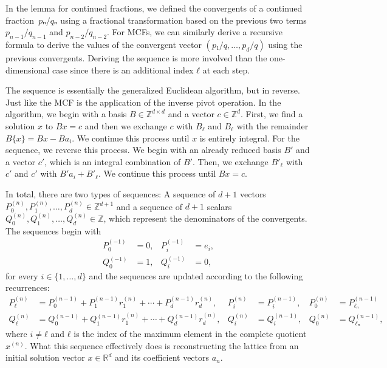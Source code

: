 In the lemma for continued fractions,
we defined the convergents of a continued fraction~$pₙ/qₙ$
using a fractional transformation based on the previous two
terms~$p_{n-1}/q_{n-1}$ and $p_{n-2}/q_{n-2}$.
For MCFs, we can similarly derive a recursive formula to derive the values of
the convergent vector $(p₁/q, \dots, p_d/q)$ using the previous convergents.
Deriving the sequence is more involved than the one-dimensional case since
there is an additional index $ℓ$ at each step.

The sequence is essentially the generalized Euclidean algorithm, but in reverse.
Just like the MCF is the application of the inverse pivot operation.
In the algorithm, we begin with a basis $B ∈ ℤ^{d×d}$ and a vector $c ∈ ℤ^d$.
First, we find a solution $x$ to $Bx = c$ and then we exchange $c$ with $B_ℓ$
and $B_ℓ$ with the remainder $B\{x\} = Bx - Ba_i$.
We continue this process until $x$ is entirely integral.
For the sequence, we reverse this process.
We begin with an already reduced basis $B'$ and a vector $c'$, which is an
integral combination of $B'$.
Then, we exchange $B'_{ℓ}$ with $c'$ and $c'$ with $B' a_i + B'_{ℓ}$.
We continue this process until $B x = c$.

In total, there are two types of sequences:
A sequence of $d+1$ vectors $P_0^{(n)}, P_1^{(n)}, …, P_d^{(n)} ∈ ℤ^{d+1}$ and a sequence
of $d+1$ scalars $Q_0^{(n)}, Q_1^{(n)}, …, Q_d^{(n)} ∈ ℤ$,
which represent the denominators of the convergents.
The sequences begin with
\begin{align*}
  P_0^{(-1)} & = 0, & P_i^{(-1)} & = e_i, \\
  Q_0^{(-1)} & = 1, & Q_i^{(-1)} & = 0,
\end{align*}
for every $i ∈ \{1, …, d\}$ and the sequences are updated according to the
following recurrences:
\begin{align*}
  P_ℓ^{(n)} & = P_0^{(n-1)} + P_1^{(n-1)} r_1^{(n)} + ⋯ + P_d^{(n-1)} r_d^{(n)}, &
  P_i^{(n)} & = P_i^{(n-1)}, &
  P_0^{(n)} & = P_{ℓₙ}^{(n-1)} \\
  Q_ℓ^{(n)} & = Q_0^{(n-1)} + Q_1^{(n-1)} r_1^{(n)} + ⋯ + Q_d^{(n-1)} r_d^{(n)}, &
  Q_i^{(n)} & = Q_i^{(n-1)}, &
  Q_0^{(n)} & = Q_{ℓₙ}^{(n-1)},
\end{align*}
where $i ≠ ℓ$ and $ℓ$ is the index of the maximum element in the complete
quotient $x^{(n)}$. %
What this sequence effectively does is reconstructing the lattice from an
initial solution vector $x ∈ ℝ^d$ and its coefficient vectors $a_n$.

